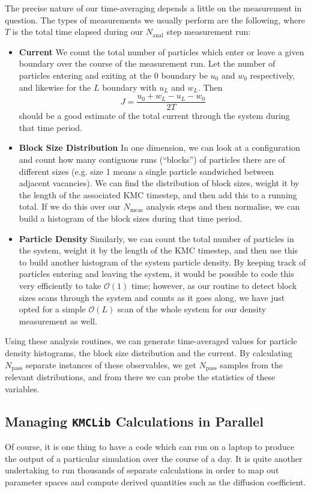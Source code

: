The precise nature of our time-averaging depends a little on the measurement in question. The types
of measurements we usually perform are the following, where $T$ is the total time elapsed during
our $N_\mathrm{anal}$ step measurement run:
\begin{itemize}
 \item \textbf{Current} We count the total number of particles which enter or leave a given boundary
 over the course of the measurement run. Let the number of particles entering and 
 exiting at the $0$ boundary be $u_0$ and $w_0$ respectively, and likewise for the $L$ boundary with
 $u_L$ and $w_L$. Then
 \begin{equation}
  J = \frac{u_0+w_L-u_L-w_0}{2T}
 \end{equation}
should be a good estimate of the total current through the system during that time period.
\item \textbf{Block Size Distribution} In one dimension, we can look at a configuration and count how
many contiguous runs (``blocks'') of particles there are of different sizes (e.g. size 1 means a single
particle sandwiched between adjacent vacancies). We can find the distribution of block sizes, weight it
by the length of the associated KMC timestep, and then add this to a running total. If we do this over
our $N_\mathrm{meas}$ analysis steps and then normalise, we can build a histogram of the block sizes
during that time period.
\item \textbf{Particle Density} Similarly, we can count the total number of particles in the system,
weight it by the length of the KMC timestep, and then use this to build another histogram of the
system particle density. By keeping track of particles entering and leaving the system, it would be
possible to code this very efficiently to take $\mathcal{O}(1)$ time; however, as our routine to detect
block sizes scans through the system and counts as it goes along, we have just opted for a simple
$\mathcal{O}(L)$ scan of the whole system for our density measurement as well.
\end{itemize}
Using these analysis routines, we can generate time-averaged values for particle density histograms,
the block size distribution and the current. By calculating $N_\mathrm{pass}$ separate instances of 
these observables, we get $N_\mathrm{pass}$ samples from the relevant distributions, and from there
we can probe the statistics of these variables.


\subsection{Managing \texttt{KMCLib} Calculations in Parallel} 
Of course, it is one thing to have a code which can run on a laptop to produce the output of a 
particular simulation over the course of a day. It is quite another undertaking to run thousands of
separate calculations in order to map out parameter spaces and compute derived quantities such as the
diffusion coefficient. 

